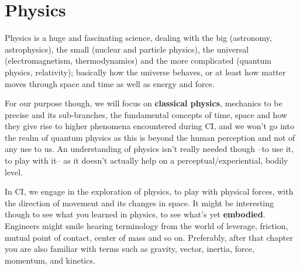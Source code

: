 \chapter{Physics}\label{ch:physics}


Physics is a huge and fascinating science, dealing with the big (astronomy, astrophysics), the small (nuclear and particle physics), the universal (electromagnetism, thermodynamics) and the more complicated (quantum physics, relativity); basically how the universe behaves, or at least how matter moves through space and time as well as energy and force.

For our purpose though, we will focus on \textbf{classical physics}, mechanics to be precise and its sub-branches, the fundamental concepts of time, space and how they give rise to higher phenomena encountered during CI, and we won't go into the realm of quantum physics as this is beyond the human perception and not of any use to us.
An understanding of physics isn't really needed though --to use it, to play with it-- as it doesn't actually help on a perceptual/experiential, bodily level.

In CI, we engage in the exploration of physics, to play with physical forces, with the direction of movement and its changes in space.
It might be interesting though to see what you learned in physics, to see what's yet \textbf{embodied}.
Engineers might smile hearing terminology from the world of leverage, friction, mutual point of contact, center of mass and so on.
Preferably, after that chapter you are also familiar with terms such as gravity, vector, inertia, force, momentum, and kinetics.




